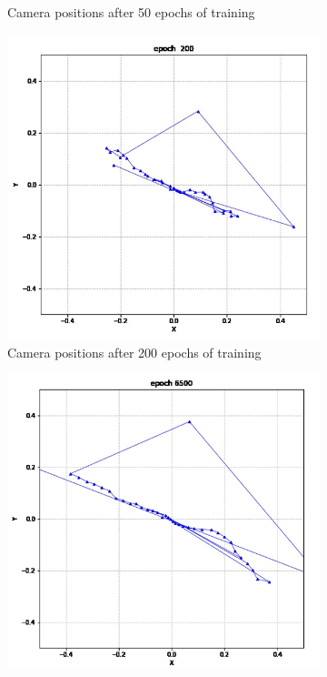 \begin{figure}[H]
\begin{subfigure}{.47\textwidth}
        \caption{Camera positions after 50 epochs of training}
        \label{fig:Image2}
    \end{subfigure}
    \begin{subfigure}{.47\textwidth} %
        \includegraphics[width=\textwidth]{img/Results/Dataset_3/Camera/150 epochs.png}
        \caption{Camera positions after 200 epochs of training}
        \label{fig:Image3}
    \end{subfigure}
    \hfill
    \begin{subfigure}{.47\textwidth} %
        \includegraphics[width=\textwidth]{img/Results/Dataset_3/Camera/200 epochs.png}

\end{subfigure}
\end{figure}
